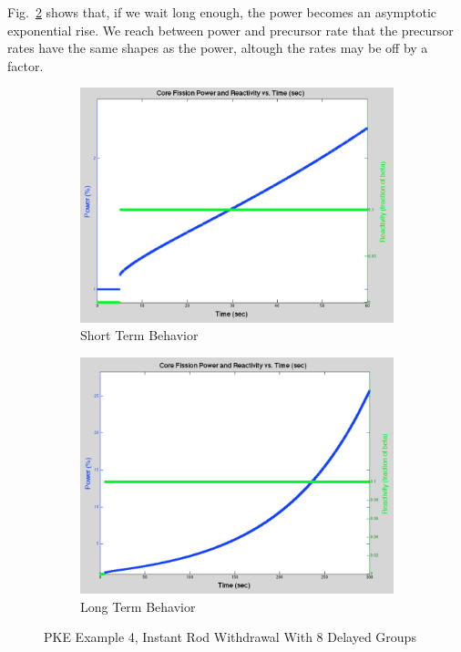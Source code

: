 \documentclass{school-22.211-notes}
\begin{document}
\begin{enumerate}
Fig.~\ref{4b} shows that, if we wait long enough, the power becomes an asymptotic exponential rise. We reach  between power and precursor rate that the precursor rates have the same shapes as the power, altough the rates may be off by a factor. 
  \begin{figure}[ht]
    \begin{subfigure}[b]{0.45\textwidth}
      \centering
      \includegraphics[width=\textwidth]{images/pke/ex4.png}
      \caption{Short Term Behavior} \label{4a} 
    \end{subfigure}
    \begin{subfigure}[b]{0.45\textwidth}
      \centering
      \includegraphics[width=\textwidth]{images/pke/ex4b.png}
      \caption{Long Term Behavior} \label{4b} 
    \end{subfigure}
    \caption{PKE Example 4, Instant Rod Withdrawal With 8 Delayed Groups} \label{ex4}
  \end{figure}


\end{enumerate}
\end{document}
